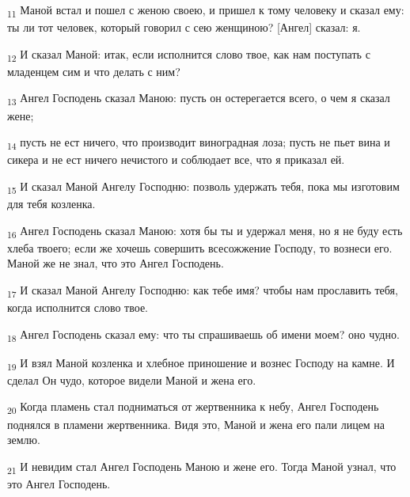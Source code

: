 \begin{tcolorbox}
\textsubscript{11} Маной встал и пошел с женою своею, и пришел к тому человеку и сказал ему: ты ли тот человек, который говорил с сею женщиною? [Ангел] сказал: я.
\end{tcolorbox}
\begin{tcolorbox}
\textsubscript{12} И сказал Маной: итак, если исполнится слово твое, как нам поступать с младенцем сим и что делать с ним?
\end{tcolorbox}
\begin{tcolorbox}
\textsubscript{13} Ангел Господень сказал Маною: пусть он остерегается всего, о чем я сказал жене;
\end{tcolorbox}
\begin{tcolorbox}
\textsubscript{14} пусть не ест ничего, что производит виноградная лоза; пусть не пьет вина и сикера и не ест ничего нечистого и соблюдает все, что я приказал ей.
\end{tcolorbox}
\begin{tcolorbox}
\textsubscript{15} И сказал Маной Ангелу Господню: позволь удержать тебя, пока мы изготовим для тебя козленка.
\end{tcolorbox}
\begin{tcolorbox}
\textsubscript{16} Ангел Господень сказал Маною: хотя бы ты и удержал меня, но я не буду есть хлеба твоего; если же хочешь совершить всесожжение Господу, то вознеси его. Маной же не знал, что это Ангел Господень.
\end{tcolorbox}
\begin{tcolorbox}
\textsubscript{17} И сказал Маной Ангелу Господню: как тебе имя? чтобы нам прославить тебя, когда исполнится слово твое.
\end{tcolorbox}
\begin{tcolorbox}
\textsubscript{18} Ангел Господень сказал ему: что ты спрашиваешь об имени моем? оно чудно.
\end{tcolorbox}
\begin{tcolorbox}
\textsubscript{19} И взял Маной козленка и хлебное приношение и вознес Господу на камне. И сделал Он чудо, которое видели Маной и жена его.
\end{tcolorbox}
\begin{tcolorbox}
\textsubscript{20} Когда пламень стал подниматься от жертвенника к небу, Ангел Господень поднялся в пламени жертвенника. Видя это, Маной и жена его пали лицем на землю.
\end{tcolorbox}
\begin{tcolorbox}
\textsubscript{21} И невидим стал Ангел Господень Маною и жене его. Тогда Маной узнал, что это Ангел Господень.
\end{tcolorbox}
